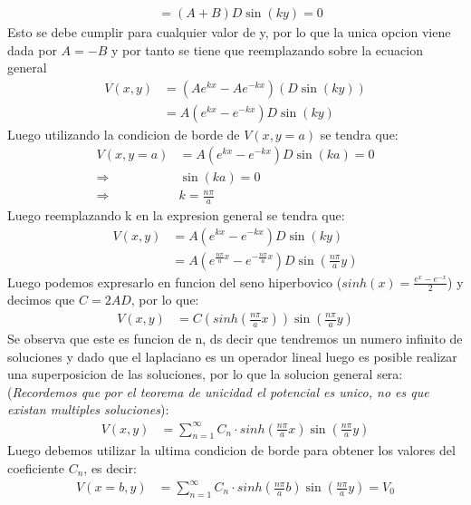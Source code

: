 \documentclass[
  11pt,
  letterpaper,
   addpoints,
   answers
  ]{exam}
\begin{document}
\begin{questions}
\begin{solution}
\begin{enumerate}
\begin{align}
            &= (A+B)D\sin(ky) = 0
        \end{align}
        Esto se debe cumplir para cualquier valor de y, por lo que la unica opcion viene dada por $A = -B$ y por tanto se tiene que reemplazando sobre la ecuacion general
        \begin{align}
            V(x,y) &= \left(Ae^{kx} - Ae^{-kx}\right)\left(D\sin(ky)\right)\\
                   &= A\left(e^{kx} - e^{-kx}\right)D\sin(ky)
        \end{align}
        Luego utilizando la condicion de borde de $V(x,y=a)$ se tendra que:
        \begin{align}
            V(x,y=a) &= A\left(e^{kx} - e^{-kx}\right)D\sin(ka) = 0\\
            \Rightarrow& \sin(ka) = 0\\
            \Rightarrow& k = \frac{n\pi}{a} 
        \end{align}
        Luego reemplazando k en la expresion general se tendra que:
        \begin{align}
            V(x,y) &= A\left(e^{kx} - e^{-kx}\right)D\sin(ky)\\
                   &= A\left(e^{\frac{n\pi}{a}x} - e^{-\frac{n\pi}{a}x}\right)D\sin\left(\frac{n\pi}{a}y\right)
        \end{align}
        Luego podemos expresarlo en funcion del seno hiperbovico ($sinh(x)= \frac{e^{x}-e^{-x}}{2}$) y decimos que $C= 2AD$, por lo que:
        \begin{align}
            V(x,y) &= C\left(sinh\left(\frac{n\pi}{a}x\right)\right)\sin\left(\frac{n\pi}{a}y\right)
        \end{align}
        Se observa que este es funcion de n, ds decir que tendremos un numero infinito de soluciones y dado que el laplaciano es un operador lineal luego es posible realizar una superposicion de las soluciones, por lo que la solucion general sera: (\textit{Recordemos que por el teorema de unicidad el potencial es unico, no es que existan multiples soluciones}):
        \begin{align}
            V(x,y) &= \sum_{n=1}^{\infty}C_{n}\cdot sinh\left(\frac{n\pi}{a}x\right)\sin\left(\frac{n\pi}{a}y\right)
        \end{align}
        Luego debemos utilizar la ultima condicion de borde para obtener los valores del coeficiente $C_{n}$, es decir:
        \begin{align}
            V(x=b,y) &= \sum_{n=1}^{\infty}C_{n} \cdot sinh\left(\frac{n\pi}{a}b\right)\sin\left(\frac{n\pi}{a}y\right) = V_{0}\\

\end{align}
\end{enumerate}
\end{solution}
\end{questions}
\end{document}
